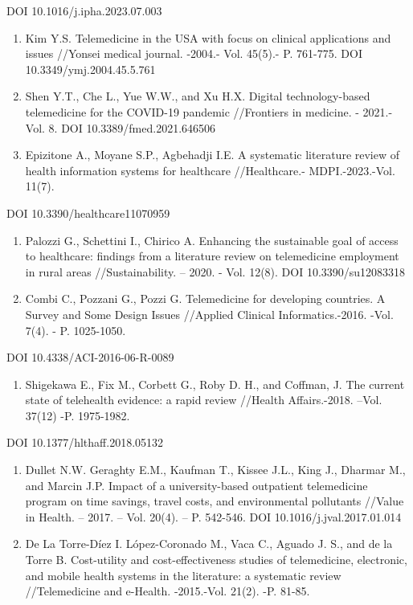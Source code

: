 DOI 10.1016/j.ipha.2023.07.003

\begin{enumerate}
\def\labelenumi{\arabic{enumi}.}
\setcounter{enumi}{7}
\item
  Kim Y.S. Telemedicine in the USA with focus on clinical applications
  and issues //Yonsei medical journal. -2004.- Vol. 45(5).- P. 761-775.
  DOI 10.3349/ymj.2004.45.5.761
\item
  Shen Y.T., Che L., Yue W.W., and Xu H.X. Digital technology-based
  telemedicine for the COVID-19 pandemic //Frontiers in medicine. -
  2021.-Vol. 8. DOI 10.3389/fmed.2021.646506
\item
  Epizitone A., Moyane S.P., Agbehadji I.E. A systematic literature
  review of health information systems for healthcare //Healthcare.-
  MDPI.-2023.-Vol. 11(7).
\end{enumerate}

DOI 10.3390/healthcare11070959

\begin{enumerate}
\def\labelenumi{\arabic{enumi}.}
\setcounter{enumi}{10}
\item
  Palozzi G., Schettini I., Chirico A. Enhancing the sustainable goal of
  access to healthcare: findings from a literature review on
  telemedicine employment in rural areas //Sustainability. -- 2020. -
  Vol. 12(8). DOI 10.3390/su12083318
\item
  Combi C., Pozzani G., Pozzi G. Telemedicine for developing countries.
  A Survey and Some Design Issues //Applied Clinical Informatics.-2016.
  -Vol. 7(4). - P. 1025-1050.
\end{enumerate}

DOI 10.4338/ACI-2016-06-R-0089

\begin{enumerate}
\def\labelenumi{\arabic{enumi}.}
\setcounter{enumi}{12}
\item
  Shigekawa E., Fix M., Corbett G., Roby D. H., and Coffman, J. The
  current state of telehealth evidence: a rapid review //Health
  Affairs.-2018. --Vol. 37(12) -P. 1975-1982.
\end{enumerate}

DOI 10.1377/hlthaff.2018.05132

\begin{enumerate}
\def\labelenumi{\arabic{enumi}.}
\setcounter{enumi}{13}
\item
  Dullet N.W. Geraghty E.M., Kaufman T., Kissee J.L., King J., Dharmar
  M., and Marcin J.P. Impact of a university-based outpatient
  telemedicine program on time savings, travel costs, and environmental
  pollutants //Value in Health. -- 2017. -- Vol. 20(4). -- P. 542-546.
  DOI 10.1016/j.jval.2017.01.014
\item
  De La Torre-Díez I. López-Coronado M., Vaca C., Aguado J. S., and de
  la Torre B. Cost-utility and cost-effectiveness studies of
  telemedicine, electronic, and mobile health systems in the literature:
  a systematic review //Telemedicine and e-Health. -2015.-Vol. 21(2).
  -P. 81-85.
\end{enumerate}


